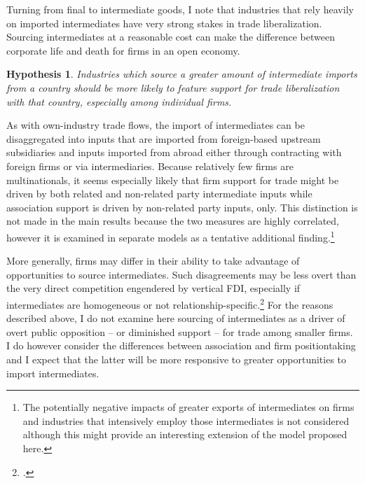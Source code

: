 \documentclass[hidelinks,12pt,letter]{article}
\newtheorem{hypo}{Hypothesis}
\begin{document}
Turning from final to intermediate goods, I note that industries that rely heavily on imported intermediates have very strong stakes in trade liberalization. Sourcing intermediates at a reasonable cost can make the difference between corporate life and death for firms in an open economy.
\begin{hypo}
Industries which source a greater amount of intermediate imports from a country should be more likely to feature support for trade liberalization with that country, especially among individual firms.
\end{hypo}
\noindent As with own-industry trade flows, the import of intermediates can be disaggregated into inputs that are imported from foreign-based upstream subsidiaries and inputs imported from abroad either through contracting with foreign firms or via intermediaries. Because relatively few firms are multinationals, it seems especially likely that firm support for trade might be driven by both related and non-related party intermediate inputs while association support is driven by non-related party inputs, only. This distinction is not made in the main results because the two measures are highly correlated, however it is examined in separate models as a tentative additional finding.\footnote{The potentially negative impacts of greater exports of intermediates on firms and industries that intensively employ those intermediates is not considered although this might provide an interesting extension of the model proposed here. %
}

More generally, firms may differ in their ability to take advantage of opportunities to source intermediates. Such disagreements may be less overt than the very direct competition engendered by vertical FDI, especially if intermediates are homogeneous or not relationship-specific.\footnote{\citealt{baccini2016intra}.} For the reasons described above, I do not examine here sourcing of intermediates as a driver of overt public opposition -- or diminished support -- for trade among smaller firms. I do however consider the differences between association and firm positiontaking and I expect that the latter will be more responsive to greater opportunities to import intermediates.
\end{document}
